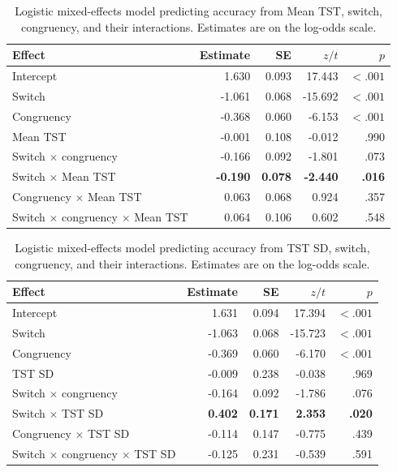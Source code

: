 \documentclass[12pt,a4paper]{report}
\begin{document}
\begin{appendices}
\begin{table}[H]
\centering
\small
\caption{Logistic mixed-effects model predicting accuracy from Mean TST, switch, congruency, and their interactions. Estimates are on the log-odds scale.}
\label{tab:app_acc_meantst}
\begin{tabularx}{\textwidth}{Xrrrr}
\toprule
Effect & Estimate & SE & $z/t$ & $p$ \\
\midrule
Intercept & 1.630 & 0.093 & 17.443 & $< .001$ \\
Switch & -1.061 & 0.068 & -15.692 & $< .001$ \\
Congruency & -0.368 & 0.060 & -6.153 & $< .001$ \\
Mean TST & -0.001 & 0.108 & -0.012 & .990 \\
Switch $\times$ congruency & -0.166 & 0.092 & -1.801 & .073 \\
Switch $\times$ Mean TST & \textbf{-0.190} & \textbf{0.078} & \textbf{-2.440} & \textbf{.016} \\
Congruency $\times$ Mean TST & 0.063 & 0.068 & 0.924 & .357 \\
Switch $\times$ congruency $\times$ Mean TST & 0.064 & 0.106 & 0.602 & .548 \\
\bottomrule
\end{tabularx}
\end{table}

\begin{table}[H]
\centering
\small
\caption{Logistic mixed-effects model predicting accuracy from TST SD, switch, congruency, and their interactions. Estimates are on the log-odds scale.}
\label{tab:app_acc_tstsd}
\begin{tabularx}{\textwidth}{Xrrrr}
\toprule
Effect & Estimate & SE & $z/t$ & $p$ \\
\midrule
Intercept & 1.631 & 0.094 & 17.394 & $< .001$ \\
Switch & -1.063 & 0.068 & -15.723 & $< .001$ \\
Congruency & -0.369 & 0.060 & -6.170 & $< .001$ \\
TST SD & -0.009 & 0.238 & -0.038 & .969 \\
Switch $\times$ congruency & -0.164 & 0.092 & -1.786 & .076 \\
Switch $\times$ TST SD & \textbf{0.402} & \textbf{0.171} & \textbf{2.353} & \textbf{.020} \\
Congruency $\times$ TST SD & -0.114 & 0.147 & -0.775 & .439 \\
Switch $\times$ congruency $\times$ TST SD & -0.125 & 0.231 & -0.539 & .591 \\
\bottomrule
\end{tabularx}
\end{table}



\end{appendices}
\end{document}
